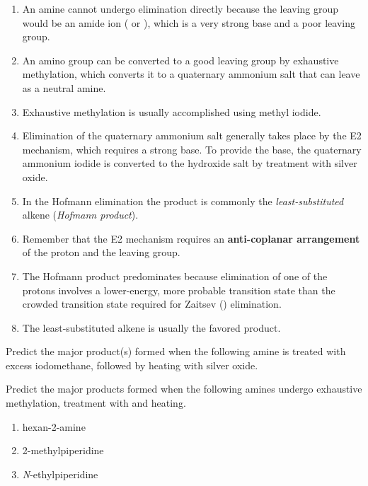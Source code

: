 \begin{enumerate}
    \item An amine cannot undergo elimination directly because the leaving group would be an amide ion ( or ), which is a very strong base and a poor leaving group.
    \item An amino group can be converted to a good leaving group by exhaustive methylation, which converts it to a quaternary ammonium salt that can leave as a neutral amine.
    \item Exhaustive methylation is usually accomplished using methyl iodide.
    \item Elimination of the quaternary ammonium salt generally takes place by the E2 mechanism, which requires a strong base. To provide the base, the quaternary ammonium iodide is converted to the hydroxide salt by treatment with silver oxide.
    \item In the Hofmann elimination the product is commonly the \textit{least-substituted} alkene (\textit{Hofmann product}).
    \item Remember that the E2 mechanism requires an \textbf{anti-coplanar arrangement} of the proton and the leaving group.
    \item The Hofmann product predominates because elimination of one of the  protons involves a lower-energy, more probable transition state than the crowded transition state required for Zaitsev () elimination.
    \item The least-substituted alkene is usually the favored product.
\end{enumerate}

\begin{example} %
    Predict the major product(s) formed when the following amine is treated with excess iodomethane, followed by heating with silver oxide.
\end{example}

\begin{example} %
    Predict the major products formed when the following amines undergo exhaustive methylation, treatment with and heating.
    \begin{enumerate}[label=(\alph*)]
        \item hexan-2-amine
        \item 2-methylpiperidine
        \item \textit{N}-ethylpiperidine
    \end{enumerate}
\end{example}


